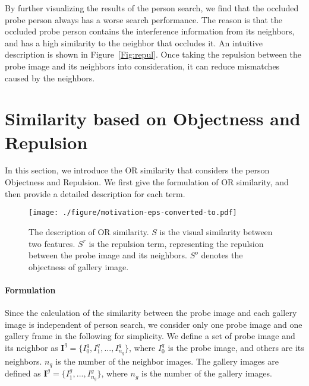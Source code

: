 \documentclass[journal]{IEEEtran}
\begin{document}
By further visualizing the results of the person search, we find that the occluded probe person always has a worse search performance. The reason is that the occluded probe person contains the interference information from its neighbors, and has a high similarity to the neighbor that occludes it. An intuitive description is shown in Figure~\ref{Fig:repul}. Once taking the repulsion between the probe image and its neighbors into consideration, it can reduce mismatches caused by the neighbors.


\section{Similarity based on Objectness and Repulsion}
In this section, we introduce the OR similarity that considers the person Objectness and Repulsion. 
We first give the formulation of OR similarity, and then provide a detailed description for each term.

\begin{figure}
\texttt{[image: ./figure/motivation-eps-converted-to.pdf]}
\caption{The description of OR similarity. $S$ is the visual similarity between two features. $S^{r}$ is the repulsion term, representing the repulsion between the probe image and its neighbors. $S^{o}$ denotes the objectness of gallery image.}
\label{Fig:framework}
\end{figure}

\paragraph{Formulation}
Since the calculation of the similarity between the probe image and each gallery image is independent of person search, we consider only one probe image and one gallery frame in the following for simplicity. 
We define a set of probe image and its neighbor as $\boldsymbol{I}^{q}=\{I^{q}_{0},I^{q}_{1},...,I^{q}_{n_{q}}\}$, where $I^{q}_{0}$ is the probe image, and others are its neighbors. $n_{q}$ is the number of the neighbor images. The gallery images are defined as $\boldsymbol{I}^{g}=\{I^{g}_{1},...,I^{g}_{n_{g}}\}$, where $n_{g}$ is the number of the gallery images. 
\end{document}
